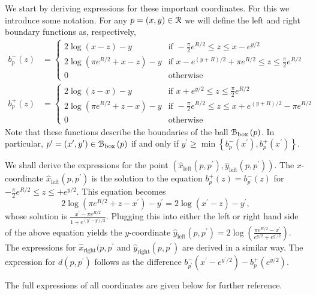 We start by deriving expressions for these important coordinates. For this we introduce some notation. For any $p = (x,y) \in {\mathcal R}$ we will define the left and right boundary functions as, respectively,
\begin{align}
	b_p^-(z) &= \begin{cases}
		2 \log\left(x-z\right) - y &\mbox{if }  -\frac{\pi}{2} e^{R/2} \le z \le x - e^{y/2}  \\
		2\log\left(\pi e^{R/2} + x - z\right) - y 
			&\mbox{if } x - e^{(y + R)/2} + \pi e^{R/2} \le z \le \frac{\pi}{2} e^{R/2}\\
		0 &\mbox{otherwise}
	\end{cases}\\
	b_p^+(z) &= \begin{cases}
		2 \log\left(z-x\right) - y &\mbox{if } x + e^{y/2} \le z \le \frac{\pi}{2} e^{R/2} \\
		2\log\left(\pi e^{R/2} + z - x\right) - y 
			&\mbox{if } -\frac{\pi}{2} e^{R/2} \le z \le x + e^{(y + R)/2} - \pi e^{R/2}\\
		0 &\mbox{otherwise}
	\end{cases}
\end{align}
Note that these functions describe the boundaries of the ball ${\mathcal B}_{\text{box}}\left(p\right)$. In particular, $p^\prime = (x^\prime, y^\prime) \in {\mathcal B}_{\text{box}}\left(p\right)$ if and only if $y^\prime \ge \min\left\{b_p^-(x^\prime), b_p^+(x^\prime)\right\}$.

We shall derive the expressions for the point $(\hat{x}_{\text{left}}(p,p^\prime), \hat{y}_{\text{left}}(p,p^\prime))$. The $x$-coordinate $\hat{x}_{\text{left}}(p,p^\prime)$ is the solution to the equation $b_{p}^+(z) = b_{p^\prime}^-(z)$ for $-\frac{\pi}{2} e^{R/2} \le z \le + e^{y/2}$. This equation becomes
\[
	2\log\left(\pi e^{R/2} + z - x^\prime\right) - y^\prime = 2 \log\left(x^\prime-z\right) - y^\prime,
\]
whose solution is $\frac{x^\prime - \pi e^{R/2}}{1 + e^{(y^\prime - y)/2}}$. Plugging this into either the left or right hand side of the above equation yields the $y$-coordinate $\hat{y}_{\text{left}}(p,p^\prime) = 2 \log\left(\frac{\pi e^{R/2} - x^\prime}{e^{y/2} + e^{y^\prime/2}}\right)$. The expressions for $\hat{x}_{\text{right}}(p,p^\prime$ and $\hat{y}_{\text{right}}(p,p^\prime)$ are derived in a similar way. The expression for $d(p,p^\prime)$ follows as the difference $b_{p^\prime}^-(x^\prime - e^{y^\prime/2}) - b_p^+(e^{y/2})$.

The full expressions of all coordinates are given below for further reference.

